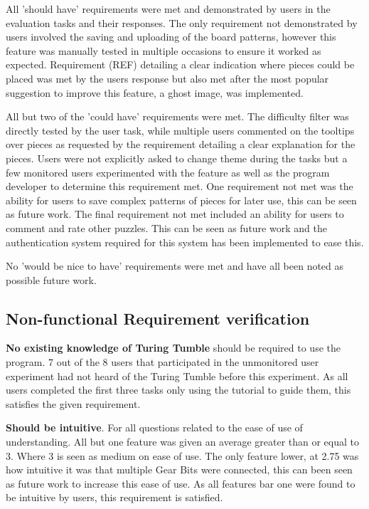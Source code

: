 \documentclass{l4proj}
\begin{document}
All 'should have' requirements were met and demonstrated by users in the evaluation tasks and their responses. The only requirement not demonstrated by users involved the saving and uploading of the board patterns, however this feature was manually tested in multiple occasions to ensure it worked as expected. Requirement (REF) detailing a clear indication where pieces could be placed was met by the users response but also met after the most popular suggestion to improve this feature, a ghost image, was implemented.

All but two of the 'could have' requirements were met. The difficulty filter was directly tested by the user task, while multiple users commented on the tooltips over pieces as requested by the requirement detailing a clear explanation for the pieces. Users were not explicitly asked to change theme during the tasks but a few monitored users experimented with the feature as well as the program developer to determine this requirement met. One requirement not met was the ability for users to save complex patterns of pieces for later use, this can be seen as future work. The final requirement not met included an ability for users to comment and rate other puzzles. This can be seen as future work and the authentication system required for this system has been implemented to ease this.

No 'would be nice to have' requirements were met and have all been noted as possible future work.

\subsection{Non-functional Requirement verification}
\textbf{No existing knowledge of Turing Tumble} should be required to use the program. 7 out of the 8 users that participated in the unmonitored user experiment had not heard of the Turing Tumble before this experiment. As all users completed the first three tasks only using the tutorial to guide them, this satisfies the given requirement.

\textbf{Should be intuitive}. For all questions related to the ease of use of understanding. All but one feature was given an average greater than or equal to 3. Where 3 is seen as medium on ease of use. The only feature lower, at 2.75 was how intuitive it was that multiple Gear Bits were connected, this can been seen as future work to increase this ease of use. As all features bar one were found to be intuitive by users, this requirement is satisfied. 
\end{document}
